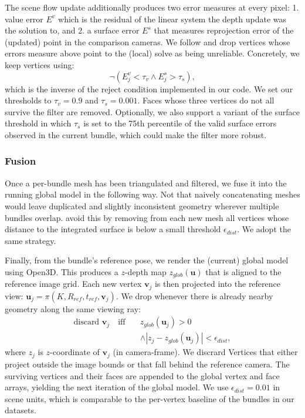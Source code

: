 \documentclass[10pt,twocolumn]{article}
\begin{document}
The scene flow update additionally produces two error measures at every pixel: 1. value error $E^v$ which is the residual of the linear system the depth update was the solution to, and 2. a surface error $E^s$ that measures reprojection error of the (updated) point in the comparison cameras.
We follow \cite{newcombe2010} and drop vertices whose errors measure above point to the (local) solve as being unreliable. Concretely, we keep vertices using:
\begin{equation}
    \neg (E^v_j < \tau_v \wedge E^s_j > \tau_s),
\end{equation}
which is the inverse of the reject condition implemented in our code. We set our thresholds to $\tau_v = 0.9$ and $\tau_s = 0.001$. Faces whose three vertices do not all survive the filter are removed. Optionally, we also support a variant of the surface threshold in which $\tau_s$ is set to the 75th percentile of the valid surface errors observed in the current bundle, which could make the filter more robust.

\subsubsection{Fusion}

Once a per-bundle mesh has been triangulated and filtered, we fuse it into the running global model in the following way. Not that naively concatenating meshes would leave duplicated and slightly inconsistent geometry wherever multiple bundles overlap. \cite{newcombe2010} avoid this by removing from each new mesh all vertices whose distance to the integrated surface is below a small threshold $\epsilon_{dist}$. We adopt the same strategy.

Finally, from the bundle's reference pose, we render the (current) global model using Open3D. This produces a $z$-depth map $z_{glob}(\mathbf{u})$ that is aligned to the reference image grid. Each new vertex $\mathbf{v}_j$ is then projected into the reference view: $\mathbf{u}_j = \pi(K, R_{ref}, t_{ref}, \mathbf{v}_j)$. We drop whenever there is already nearby geometry along the same viewing ray:
\begin{align}
    \text{discard } \mathbf{v}_j \quad \text{iff} \quad & z_{glob}(\mathbf{u}_j) > 0 \nonumber \\
    & \wedge |z_j - z_{glob}(\mathbf{u}_j)| < \epsilon_{dist},
\end{align}
where $z_j$ is $z$-coordinate of $\mathbf{v}_j$ (in camera-frame). We discrard Vertices that either project outside the image bounds or that fall behind the reference camera. The surviving vertices and their faces are appended to the global vertex and face arrays, yielding the next iteration of the global model. We use $\epsilon_{dist} = 0.01$ in scene units, which is comparable to the per-vertex baseline of the bundles in our datasets.
\end{document}
